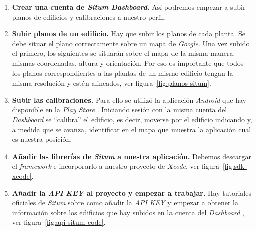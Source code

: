\begin{enumerate}
\item \textbf{Crear una cuenta de \textit{Situm Dashboard}.} Así podremos empezar a subir planos de edificios y calibraciones \cite{noauthor_situm_nodate} a nuestro perfil. 

\item \textbf{Subir planos de un edificio.}\label{item:calib~.aciones} Hay que subir los planos de cada planta. Se debe situar el plano correctamente sobre un mapa de \textit{Google}. Una vez subido el primero, los siguientes se situarán sobre el mapa de la misma manera: mismas coordenadas, altura y orientación. Por eso es importante que todos los planos correspondientes a las plantas de un mismo edificio tengan la misma resolución y estén alineados, ver figura~\ref{fig:planos-situm}.

\item{}\textbf{Subir las calibraciones.} Para ello se utilizó la aplicación \textit{Android} que hay disponible en la \textit{Play Store} \cite{noauthor_aplicacion_nodate}. Iniciando sesión con la misma cuenta del \textit{Dashboard} se ``calibra'' el edificio, es decir, moverse por el edificio indicando y, a medida que se avanza, identificar en el mapa que muestra la aplicación cual es nuestra posición.

\item{}\textbf{Añadir las librerías de \textit{Situm} a nuestra aplicación.} Debemos descargar el \textit{framework} \cite{situm_situm_nodate} e incorporarlo a nuestro proyecto de \textit{Xcode}, ver figura~\ref{fig:sdk-xcode}.

\item{}\textbf{Añadir la \textit{API KEY} al proyecto y empezar a trabajar.} Hay tutoriales oficiales de \textit{Situm} sobre como añadir la \textit{API KEY} y empezar a obtener la información sobre los edificios que hay subidos en la cuenta del \textit{Dashboard} \cite{noauthor_situm_nodate}, ver figura~\ref{fig:api-situm-code}.


\end{enumerate}
